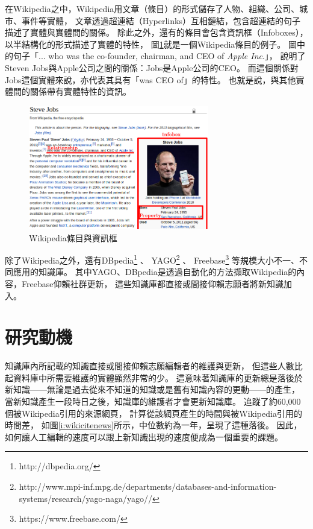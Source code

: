 在Wikipedia之中，Wikipedia用文章（條目）的形式儲存了人物、組織、公司、城市、事件等實體，
文章透過超連結（Hyperlinks）互相鏈結，包含超連結的句子描述了實體與實體間的關係。
除此之外，還有的條目會包含資訊框（Infoboxes），以半結構化的形式描述了實體的特性，
圖\ref{i:wiki}就是一個Wikipedia條目的例子。
圖中的句子「... who was the co-founder, chairman, and CEO of \emph{Apple Inc}.」，
說明了Steven Jobs與Apple公司之間的關係：Jobs是Apple公司的CEO。
而這個關係對Jobs這個實體來說，亦代表其具有「was CEO of」的特性。
也就是說，與其他實體間的關係帶有實體特性的資訊。

\begin{figure}
\centering
\includegraphics[width=0.7\textwidth]{images/01-wiki-as-kb}
\caption{Wikipedia條目與資訊框}
\label{i:wiki}
\end{figure}

除了Wikipedia之外，還有DBpedia\footnote{http://dbpedia.org/} \citep{dbpedia}、
YAGO\footnote{http://www.mpi-inf.mpg.de/departments/databases-and-information-systems/research/yago-naga/yago//} \citep{yago}、
Freebase\footnote{https://www.freebase.com/} \citep{freebase}等規模大小不一、不同應用的知識庫。
其中YAGO、DBpedia是透過自動化的方法擷取Wikipedia的內容，Freebase仰賴社群更新，
這些知識庫都直接或間接仰賴志願者將新知識加入。

%
%
\section{研究動機}
知識庫內所記載的知識直接或間接仰賴志願編輯者的維護與更新，
但這些人數比起資料庫中所需要維護的實體顯然非常的少。
這意味著知識庫的更新總是落後於新知識——無論是過去從來不知道的知識或是舊有知識內容的更動——的產生，
當新知識產生一段時日之後，知識庫的維護者才會更新知識庫。
\cite{kba2012}追蹤了約60,000個被Wikipedia引用的來源網頁，
計算從該網頁產生的時間與被Wikipedia引用的時間差，
如圖\ref{i:wikicitenews}所示，中位數約為一年，呈現了這種落後。
因此，如何讓人工編輯的速度可以跟上新知識出現的速度便成為一個重要的課題。

